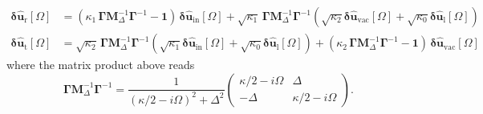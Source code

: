 \begin{equation}
  \begin{split}
  \mathbf{\delta \hat{u}_{\mathrm{r}}}[\Omega]  &= ( \kappa_1 \, \mathbf{\Gamma} \mathbf{M}^{-1}_\Delta \mathbf{\Gamma}^{-1}- \mathbf{1} )\, \mathbf{\delta \hat{u}_{\mathrm{in}}}[\Omega] +  \sqrt{\kappa_1} \,\mathbf{\Gamma}  \mathbf{M}^{-1}_\Delta \mathbf{\Gamma}^{-1} (\sqrt{\kappa_2} \mathbf{\delta \hat{u}_{\mathrm{vac}}}[\Omega] + \sqrt{\kappa_0}  \mathbf{\delta \hat{u}_{\mathrm{l}}}[\Omega] ) \\
  \mathbf{\delta \hat{u}_{\mathrm{t}}}[\Omega] & =  \sqrt{\kappa_2} \,\mathbf{\Gamma}  \mathbf{M}^{-1}_\Delta \mathbf{\Gamma}^{-1} (\sqrt{\kappa_1} \mathbf{\delta \hat{u}_{\mathrm{in}}}[\Omega] + \sqrt{\kappa_0}  \mathbf{\delta \hat{u}_{\mathrm{l}}}[\Omega] ) +  (\kappa_2 \,\mathbf{\Gamma}  \mathbf{M}^{-1}_\Delta \mathbf{\Gamma}^{-1}- \mathbf{1}) \, \mathbf{\delta \hat{u}_{\mathrm{vac}}}[\Omega] 
  \end{split}
\end{equation}
where the matrix product above reads 
\begin{equation*}
  \mathbf{\Gamma}  \mathbf{M}^{-1}_\Delta \mathbf{\Gamma}^{-1}
= \frac{1}{\left(\kappa/2-i\Omega\right)^{2}+\Delta^{2}}
\begin{pmatrix}
\kappa/2-i\Omega & \Delta \\[6pt]
-\Delta & \kappa/2-i\Omega
\end{pmatrix}.
\end{equation*}


